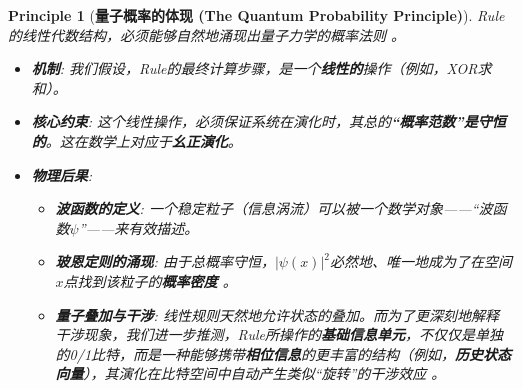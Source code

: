 \documentclass[11pt, a4paper]{article}
\newtheorem{principle}{Principle}[section]  %
\begin{document}
\begin{principle}[\textbf{量子概率的体现 (The Quantum Probability Principle)}]
Rule的线性代数结构，必须能够自然地涌现出量子力学的概率法则 \cite{deBroglie1930, Bohm1952}。
\begin{itemize}
    \item \textbf{机制}: 我们假设，Rule的最终计算步骤，是一个\textbf{线性的}操作（例如，XOR求和）。
    \item \textbf{核心约束}: 这个线性操作，必须保证系统在演化时，其总的\textbf{“概率范数”是守恒的}。这在数学上对应于\textbf{幺正演化}。
    \item \textbf{物理后果}:
    \begin{itemize}
        \item \textbf{波函数的定义}: 一个稳定粒子（信息涡流）可以被一个数学对象——“波函数$\psi$”——来有效描述。
        \item \textbf{玻恩定则的涌现}: 由于总概率守恒，$|\psi(x)|^2$必然地、唯一地成为了在空间$x$点找到该粒子的\textbf{概率密度} \cite{deBroglie1930}。
        \item \textbf{量子叠加与干涉}: 线性规则天然地允许状态的叠加。而为了更深刻地解释干涉现象，我们进一步推测，Rule所操作的\textbf{基础信息单元}，不仅仅是单独的0/1比特，而是一种能够携带\textbf{相位信息}的更丰富的结构（例如，\textbf{历史状态向量}），其演化在比特空间中自动产生类似“旋转”的干涉效应 \cite{deBroglie1930}。
    \end{itemize}
\end{itemize}
\end{principle}
\end{document}
